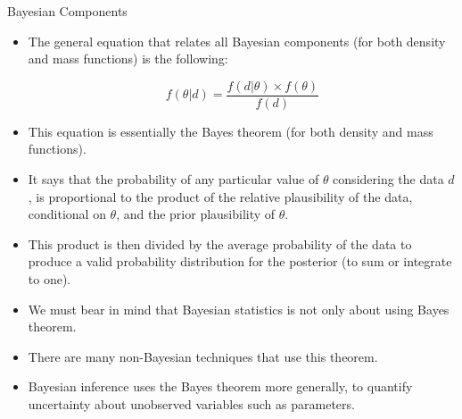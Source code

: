 \documentclass[handout]{beamer}
\begin{document}
\begin{frame}{Bayesian Components}
\scriptsize{
\begin{itemize}

\item The general equation that relates all Bayesian components (for both density and mass functions) is the following:

\begin{equation}
 f(\theta|d) = \frac{f(d|\theta) \times f(\theta)}{f(d)}
\end{equation}

\item This equation is essentially the Bayes theorem (for both density and mass functions).

\item It says that the probability of any particular value of $\theta$ considering the data $d$, is proportional to the product of the relative plausibility of the data, conditional on $\theta$, and the prior plausibility of $\theta$.

\item This product is then divided by the average probability of the data to produce a valid probability distribution for the posterior (to sum or integrate to one).

\item We must bear in mind that Bayesian statistics is not only about using Bayes theorem. 

\item There are many non-Bayesian techniques that use this theorem.

\item Bayesian inference uses the Bayes theorem more generally, to quantify uncertainty about unobserved variables such as parameters.
\end{itemize}
 } 

\end{frame}
\end{document}
